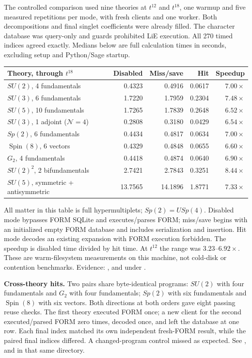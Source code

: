 \clearpage
{}
The controlled comparison used nine theories at $t^{12}$ and $t^{18}$, one
warmup and five measured repetitions per mode, with fresh clients and one worker.
Both decompositions and final singlet coefficients were already filled.
The character database was query-only and guards prohibited LiE execution.
All 270 timed indices agreed exactly. Medians below are full calculation times
in seconds, excluding setup and Python/Sage startup.

\begin{tabularx}{\textwidth}{@{}Yrrrr@{}}
\toprule Theory, through $t^{18}$ & Disabled & Miss/save & Hit & Speedup\\\midrule
$SU(2)$, 4 fundamentals & 0.4323 & 0.4916 & 0.0617 & $7.00\times$\\
$SU(3)$, 6 fundamentals & 1.7220 & 1.7959 & 0.2304 & $7.48\times$\\
$SU(5)$, 10 fundamentals & 1.7265 & 1.7839 & 0.2648 & $6.52\times$\\
$SU(3)$, 1 adjoint ($\mathcal N=4$) & 0.2808 & 0.3180 & 0.0429 & $6.54\times$\\
$Sp(2)$, 6 fundamentals & 0.4434 & 0.4817 & 0.0634 & $7.00\times$\\
$\operatorname{Spin}(8)$, 6 vectors & 0.4329 & 0.4848 & 0.0655 & $6.60\times$\\
$G_2$, 4 fundamentals & 0.4418 & 0.4874 & 0.0640 & $6.90\times$\\
$SU(2)^2$, 2 bifundamentals & 2.7421 & 2.7843 & 0.3251 & $8.44\times$\\
$SU(5)$, symmetric + antisymmetric & 13.7565 & 14.1896 & 1.8771 & $7.33\times$\\\bottomrule
\end{tabularx}
All matter in this table is full hypermultiplets; $Sp(2)=USp(4)$. Disabled mode
bypasses FORM SQLite and executes/parses FORM; miss/save begins with an
initialized empty FORM database and includes serialization and insertion.
Hit mode decodes an existing expansion with FORM execution forbidden. The
speedup is disabled time divided by hit time. At $t^{12}$ the range was
$3.23$--$6.92\times$. These are warm-filesystem measurements on this machine,
not cold-disk or contention benchmarks. Evidence: ,
 and  under
.

\textbf{Cross-theory hits.} Two pairs share byte-identical programs:
$SU(2)$ with four fundamentals and $G_2$ with four fundamentals;
$Sp(2)$ with six fundamentals and $\operatorname{Spin}(8)$ with six vectors.
Both directions at both orders gave eight passing reuse checks. The first
theory executed FORM once; a new client for the second executed/parsed FORM
zero times, decoded once, and left the database at one row. Each final index
matched its own independent fresh-FORM result, while the paired final indices
differed. A changed-program control missed as expected. See
,  and
 in that same directory.

